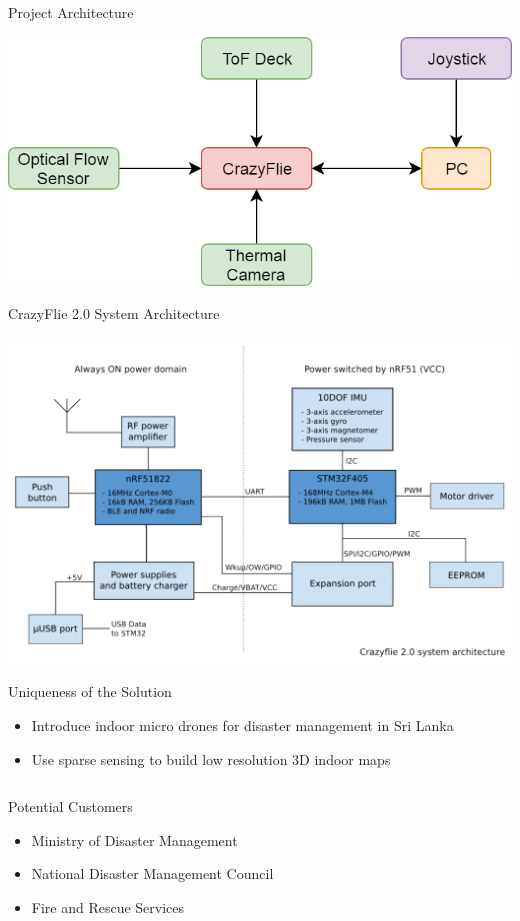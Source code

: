 \documentclass[xcolor=table]{beamer}
\begin{document}
\begin{frame}{Project Architecture}
\begin{center}
  \includegraphics[scale=0.3]{FYP_Archi.png}
  \end{center}
\end{frame}

\begin{frame}{CrazyFlie 2.0 System Architecture}
  \begin{center}
  \includegraphics[scale=0.3]{Crazy_Archi.png}
  \end{center}
\end{frame}

\begin{frame}{Uniqueness of the Solution}
  \begin{itemize}
  \item Introduce indoor micro drones for disaster management in Sri Lanka
  \item Use sparse sensing to build low resolution 3D indoor maps
  \end{itemize}

  \begin{columns}
  \begin{block}{Potential Customers} 
  \begin{itemize}
  \item Ministry of Disaster Management
  \item National Disaster Management Council
  \item Fire and Rescue Services
  \end{itemize}
  \end{block}
  \end{columns} 
\end{frame}
\end{document}
